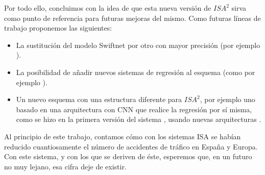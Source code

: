 
Por todo ello, concluimos con la idea de que esta nueva versión de $ISA^{2}$ sirva como punto de referencia para futuras mejoras del mismo. Como futuras líneas de trabajo proponemos las siguientes:

\begin{itemize}
\item La sustitución del modelo Swiftnet por otro con mayor precisión (por ejemplo \cite{hierarchical-multiscale}).
\item La posibilidad de añadir nuevos sistemas de regresión al esquema (como por ejemplo \cite{ridge}).
\item Un nuevo esquema con una estructura diferente para $ISA^{2}$, por ejemplo uno basado en una arquitectura con \ac{CNN} que realice la regresión por sí misma, como se hizo en la primera versión del sistema \cite{isa2}, usando nuevas arquitecturas \cite{cnn-ss}.
\end{itemize}

Al principio de este trabajo, contamos cómo con los sistemas \ac{ISA} se habían reducido cuantiosamente el número de accidentes de tráfico en España y Europa. Con este sistema, y con los que se deriven de éste, esperemos que, en un futuro no muy lejano, esa cifra deje de existir.
